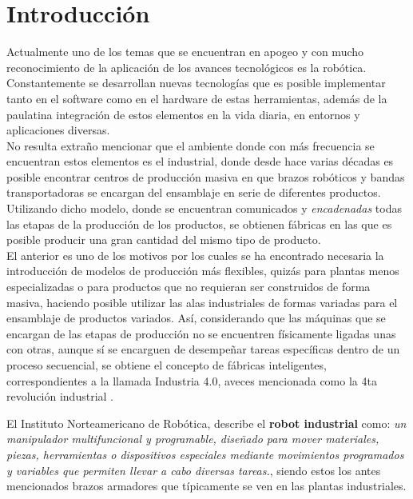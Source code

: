 \chapter{Introducción}

 Actualmente uno de los temas que se encuentran en apogeo y con mucho reconocimiento de la aplicación de los avances tecnológicos es la robótica. Constantemente se desarrollan nuevas tecnologías que es posible implementar tanto en el software como en el hardware de estas herramientas, además de la paulatina integración de estos elementos en la vida diaria, en entornos y aplicaciones diversas.\\

 No resulta extraño mencionar que el ambiente donde con más frecuencia se encuentran estos elementos es el industrial, donde desde hace varias décadas es posible encontrar centros de producción masiva en que brazos robóticos y bandas transportadoras se encargan del ensamblaje en serie de diferentes productos. Utilizando dicho modelo, donde se encuentran comunicados y \textit{encadenadas} todas las etapas de la producción de los productos, se obtienen fábricas en las que es posible producir una gran cantidad del mismo tipo de producto.\\

 El anterior es uno de los motivos por los cuales se ha encontrado necesaria la introducción de modelos de producción más flexibles, quizás para plantas menos especializadas o para productos que no requieran ser construidos de forma masiva, haciendo posible utilizar las alas industriales de formas variadas para el ensamblaje de productos variados. Así, considerando que las máquinas que se encargan de las etapas de producción no se encuentren físicamente ligadas unas con otras, aunque sí se encarguen de desempeñar tareas específicas dentro de un proceso secuencial, se obtiene el concepto de fábricas inteligentes, correspondientes a la llamada Industria 4.0, aveces mencionada como la 4ta revolución industrial \cite{kohout_multi-robot_2020}.   

El Instituto Norteamericano de Robótica, describe el \textbf{robot industrial} como: \textit{un manipulador multifuncional y programable, diseñado para mover materiales, piezas, herramientas o dispositivos especiales mediante movimientos programados y variables que permiten llevar a cabo diversas tareas.}\cite{navarro_pina_robot_2021}, siendo estos los antes mencionados brazos armadores que típicamente se ven en las plantas industriales. 

